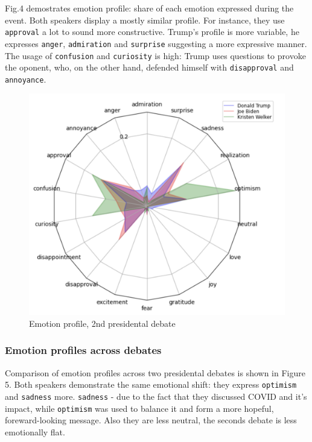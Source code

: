 \documentclass[pdflatex,sn-mathphys-num]{sn-jnl}%
\begin{document}
Fig.4 demostrates emotion profile: share of each emotion expressed during the event.
Both speakers display a mostly similar profile. For instance, they use \texttt{approval} a lot to sound more constructive.
Trump's profile is more variable, he expresses \texttt{anger}, \texttt{admiration} and \texttt{surprise} suggesting a more expressive manner. The usage of \texttt{confusion} and \texttt{curiosity} is high: Trump uses questions to provoke the oponent, who, on the other hand, defended himself with \texttt{disapproval} and \texttt{annoyance}. 

\begin{figure}[h]
	\centering
	\includegraphics[width=14cm]{f4-emotion_profile.png}
	\caption{Emotion profile, 2nd presidental debate}
\end{figure}

\newpage
\subsubsection{Emotion profiles across debates}


Comparison of emotion profiles across two presidental debates is shown in Figure 5.
Both speakers demonstrate the same emotional shift: they express \texttt{optimism} and \texttt{sadness} more. \texttt{sadness} - due to the fact that they discussed COVID and it's impact, while \texttt{optimism} was used to balance it and form a more hopeful, foreward-looking message. Also they are less neutral, the seconds debate is less emotionally flat.
\end{document}
